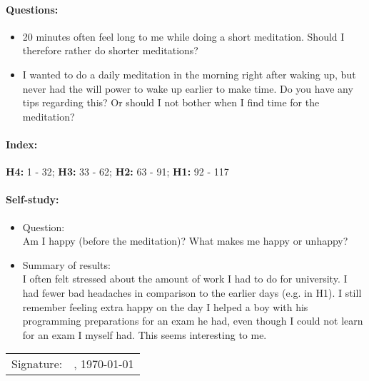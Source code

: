 \documentclass[11pt,a4paper]{article}
\begin{document}
\paragraph{Questions:}
\begin{itemize}
    \item 20 minutes often feel long to me while doing a short meditation. Should I therefore rather do shorter meditations?
    \item I wanted to do a daily meditation in the morning right after waking up, but never had the will power to wake up earlier to make time. Do you have any tips regarding this? Or should I not bother when I find time for the meditation?
\end{itemize}

\paragraph{Index:}
\textbf{H4:} 1 - 32; \textbf{H3:} 33 - 62; \textbf{H2:} 63 - 91; \textbf{H1:} 92 - 117


\paragraph{Self-study:}
\begin{itemize}
	\item Question:\\
	Am I happy (before the meditation)? What makes me happy or unhappy?
	\item Summary of results:\\
	I often felt stressed about the amount of work I had to do for university. I had fewer bad headaches in comparison to the earlier days (e.g. in H1). I still remember feeling extra happy on the day I helped a boy with his programming preparations for an exam he had, even though I could not learn for an exam I myself had. This seems interesting to me.
\end{itemize}

\vspace*{\fill}

\begin{tabular}{@{}p{.5in}p{4in}@{}}
    Signature: & \hrulefill , \today{} \\
\end{tabular}

\newpage
\end{document}
